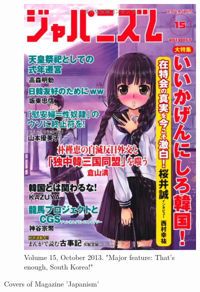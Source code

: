 \documentclass[10pt,british,A4paper,,openany]{memoir}
\begin{document}
\begin{figure}[!htb]
\begin{subfigure}[b]{0.30\textwidth}
  \includegraphics[width=\textwidth]{images/japanism4.jpg}
  \caption{Volume 15, October 2013. "Major feature: That's enough, South Korea!"}
  \label{fig:twitter2}
 \end{subfigure}
 \caption{Covers of Magazine 'Japanism'}\label{fig:twitter}
\end{figure}
\end{document}
